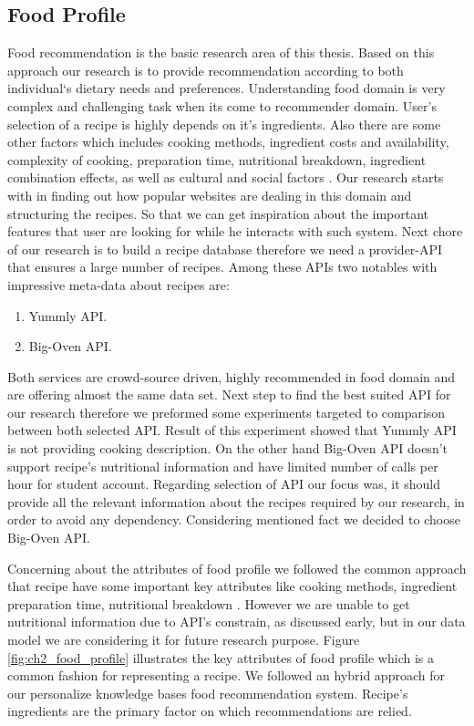 \subsection{Food Profile}

Food recommendation is the basic research area of this thesis. Based on this approach our research is to provide recommendation according to both individual‘s dietary needs and preferences. Understanding food domain is very complex and challenging task when its come to recommender domain. User’s selection of a recipe is highly depends on it’s ingredients. Also there are some other factors which includes cooking methods, ingredient costs and availability, complexity of cooking, preparation time, nutritional breakdown, ingredient combination effects, as well as cultural and social factors \cite{freyne2010recommending}. Our research starts with in finding out how popular websites are dealing in this domain and structuring the recipes. So that we can get inspiration about the important features that user are looking for while he interacts with such system. Next chore of our research is to build a recipe database therefore we need a provider-API that ensures a large number of recipes. Among these APIs two notables with impressive meta-data about recipes are:

\begin{enumerate}
	\item Yummly API.
	\item Big-Oven API.	
\end{enumerate}

Both services are crowd-source driven, highly recommended in food domain and are offering almost the same data set. Next step to find the best suited API for our research therefore we preformed some experiments targeted to comparison between both selected API. Result of this experiment showed that Yummly API is not providing cooking description. On the other hand Big-Oven API doesn’t support recipe’s nutritional information and have limited number of calls per hour for student account. Regarding selection of API our focus was, it should provide all the relevant information about the recipes required by our research, in order to avoid any dependency. Considering mentioned fact we decided to choose Big-Oven API.\newline

Concerning about the attributes of food profile we followed the common approach that recipe have some important key attributes like cooking methods, ingredient preparation time, nutritional breakdown \cite{freyne2010recommending}.  However we are unable to get nutritional information due to API’s constrain, as discussed early, but in our data model we are considering it for future research purpose.  Figure \ref{fig:ch2_food_profile} illustrates the key attributes of food profile which is a common fashion for representing a recipe. We followed an hybrid approach \cite{suksom2010knowledge}
\cite{teng2012recipe} \cite{freyne2010recommending} for our personalize knowledge bases food recommendation system. Recipe’s ingredients are the primary factor on which recommendations are relied. 

